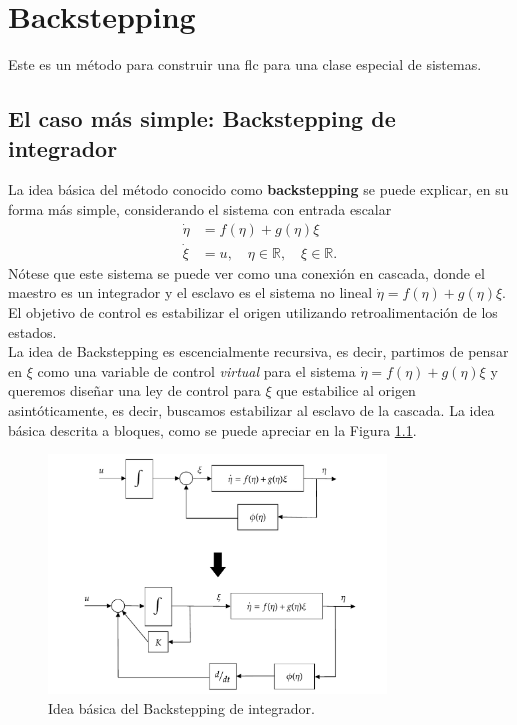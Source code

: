 \chapter{Backstepping}
Este es un método para construir una \gls{flc} para una clase especial de sistemas.\\

\section{El caso más simple: Backstepping de integrador}
La idea básica del método conocido como \textbf{backstepping} se puede explicar, en su forma más simple, considerando el sistema con entrada escalar
\begin{equation}
	\begin{aligned}
		\dot{\eta} & = f(\eta) + g(\eta)\xi                                    \\
		\dot{\xi}  & = u, \quad \eta \in \mathbb{R}, \quad \xi \in \mathbb{R}.
	\end{aligned}
	\label{eq: backstepping_integrador}
\end{equation}
Nótese que este sistema se puede ver como una conexión en cascada, donde el maestro es un integrador y el esclavo es el sistema no lineal $\dot{\eta} = f(\eta) + g(\eta)\xi$. El objetivo de control es estabilizar el origen utilizando retroalimentación de los estados.\\

La idea de Backstepping es escencialmente recursiva, es decir, partimos de pensar en $\xi$ como una variable de control \textit{virtual} para el sistema $\dot{\eta} = f(\eta) + g(\eta)\xi$ y queremos diseñar una ley de control para $\xi$ que estabilice al origen asintóticamente, es decir, buscamos estabilizar al esclavo de la cascada. La idea básica descrita a bloques, como se puede apreciar en la Figura \ref{fig: backstepping_bloques}.\\

\begin{figure}[H]
	\centering
	\includegraphics[width=0.8\textwidth]{img/backstepping_BlockDiagram.pdf}
	\caption{Idea básica del Backstepping de integrador.}
	\label{fig: backstepping_bloques}
\end{figure}

